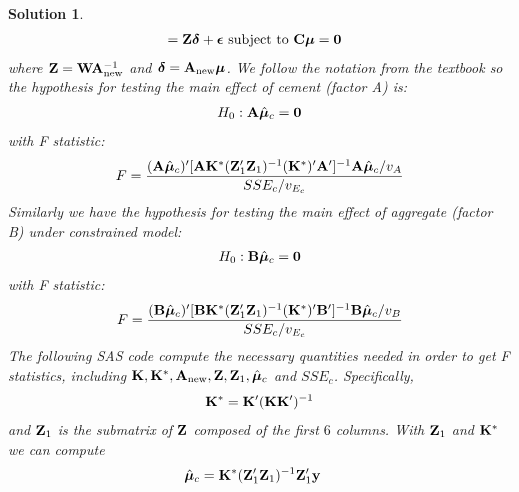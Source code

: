 \documentclass[11pt]{article}
\newtheorem{sol}{Solution}
\begin{document}
\begin{sol}
\begin{align*}
     	&= {\bf Z}{\bm \delta} + {\bm\epsilon}  \text{ subject to } {\bf C}{\bm\mu}= {\bf 0}
     \end{align*}
     where ${\bf Z} = {\bf W}{\bf A}_{\text{new}}^{-1}$ and ${\bm\delta} = {\bf A}_{\text{new}}{\bm\mu}$.\vskip 2mm
	We follow the notation from the textbook so the hypothesis for testing the main effect of cement (factor A) is:
	\begin{align*}
		H_0: {\bf A}\hat{{\bm \mu}}_c= {\bf 0}
	\end{align*}
	with F statistic:
	\begin{align*}
		F = \frac{({\bf A}\hat{{\bm \mu}}_c)'[{\bf A}{\bf K}^{\ast}({\bf Z}_1'{\bf Z}_1)^{-1}({\bf K}^{\ast })'{\bf A}']^{-1}{\bf A}\hat{{\bm \mu}}_c/v_A}{SSE_c/v_{E_c}}
	\end{align*}
	Similarly we have the hypothesis for testing the main effect of aggregate (factor B) under constrained model:
	\begin{align*}
		H_0: {\bf B}\hat{{\bm \mu}}_c= {\bf 0}
	\end{align*}
	with F statistic:
	\begin{align*}
		F = \frac{({\bf B}\hat{{\bm \mu}}_c)'[{\bf B}{\bf K}^{\ast}({\bf Z}_1'{\bf Z}_1)^{-1}({\bf K}^{\ast })'{\bf B}']^{-1}{\bf B}\hat{{\bm \mu}}_c/v_B}{SSE_c/v_{E_c}}
	\end{align*}
	The following SAS code compute the necessary quantities needed in order to get F statistics, including ${\bf K}, {\bf K}^{\ast}, {\bf A}_{\text{new}}, {\bf Z}, {\bf Z}_1, \hat{{\bm\mu}}_c$ and $SSE_c$. Specifically, 
	\begin{align*}
		{\bf K}^{\ast} = {\bf K}'({\bf K}{\bf K}')^{-1}
	\end{align*}
	and ${\bf Z}_1$ is the submatrix of ${\bf Z}$ composed of the first $6$ columns. With ${\bf Z}_1$ and ${\bf K}^{\ast}$ we can compute
	\begin{align*}
		\hat{{\bm \mu}}_c &= {\bf K}^{\ast}({\bf Z}_1'{\bf Z}_1)^{-1}{\bf Z}'_1{\bf y}

\end{align*}
\end{sol}
\end{document}
